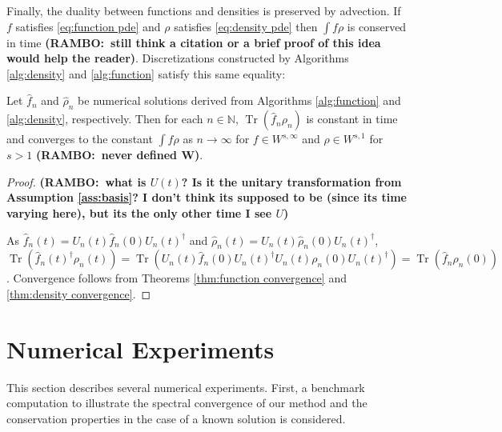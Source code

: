 \documentclass[final,leqno]{siamltex1213}
\newcommand{\ram}[1]{{\normalsize{\textbf{({\color{red}RAMBO:\ }#1)}}}}
\DeclareMathOperator{\Tr}{Tr}
\begin{document}
Finally, the duality between functions and densities is preserved by advection.  If $f$ satisfies \eqref{eq:function pde} and $\rho $ satisfies \eqref{eq:density pde} then $\int f \rho$ is conserved in time \ram{still think a citation or a brief proof of this idea would help the reader}.
Discretizations constructed by Algorithms \ref{alg:density} and \ref{alg:function} satisfy this same equality:
\begin{theorem}
	Let $\hat{f}_{n}$ and $\hat{\rho}_{n}$ be numerical solutions derived from Algorithms \ref{alg:function} and \ref{alg:density}, respectively.
	Then for each $n \in \mathbb{N}$, $\Tr( \hat{f}_{n} \rho_{n} )$ is constant in time and converges to the constant $\int f \rho$ as $n \to \infty$ for $f \in W^{s,\infty}$ and $\rho \in W^{s,1}$ for $s>1$ \ram{never defined W}.
\end{theorem}
\begin{proof}
\ram{what is $U(t)$? Is it the unitary transformation from Assumption \ref{ass:basis}? I don't think its supposed to be (since its time varying here), but its the only other time I see $U$}

	As $\hat{f}_{n}(t) = U_{n}(t) \hat{f}_{n}(0) U_{n}(t)^{\dagger}$ and $\hat{\rho}_{n}(t) = U_{n}(t) \hat{\rho}_{n}(0) U_{n}(t)^{\dagger}$, $\Tr( \hat{f}_{n}(t)^{\dagger} \rho_{n}(t) ) = \Tr( U_{n}(t) \hat{f}_{n}(0) U_{n}(t)^{\dagger} U_{n}(t) \rho_{n}(0) U_{n}(t)^{\dagger}) = \Tr( \hat{f}_{n} \rho_{n}(0) )$.
	Convergence follows from Theorems \ref{thm:function convergence} and \ref{thm:density convergence}.
\end{proof}

\section{Numerical Experiments}

This section describes several numerical experiments.  First, a benchmark computation to illustrate the spectral convergence of our method and the conservation properties in the case of a known solution is considered.
\end{document}
